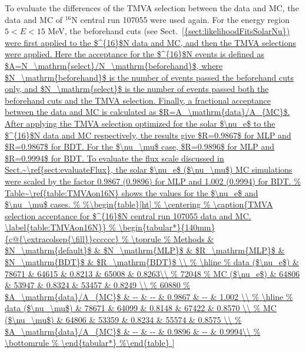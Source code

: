 To evaluate the differences of the TMVA selection between the data and MC, the data and MC of $^{16}$N central run 107055 were used again. For the energy region $5<E<15$ MeV, the beforehand cuts (see Sect.~\ref{{sect:likelihoodFitsSolarNu}) were first applied to the $^{16}$N data and MC, and then the TMVA selections were applied. Here the acceptance for the $^{16}$N events is defined as $A=N_\mathrm{select}/N_\mathrm{beforehand}$, where $N_\mathrm{beforehand}$ is the number of events passed the beforehand cuts only, and $N_\mathrm{select}$ is the number of events passed both the beforehand cuts and the TMVA selection. Finally, a fractional acceptance between the data and MC is calculated as $R=A_\mathrm{data}/A_{MC}$. After applying the TMVA selection optimized for the solar $\nu_e$ to the $^{16}$N data and MC respectively, the results give $R=0.9867$ for MLP and $R=0.9867$ for BDT. For the $\nu_\mu$ case, $R=0.9896$ for MLP and $R=0.9994$ for BDT. To evaluate the flux scale discussed in Sect.~\ref{sect:evaluateFlux}, the solar $\nu_e$ ($\nu_\mu$) MC simulations were scaled by the factor 0.9867 (0.9896) for MLP and 1.002 (0.9994) for BDT.
	
%



}
